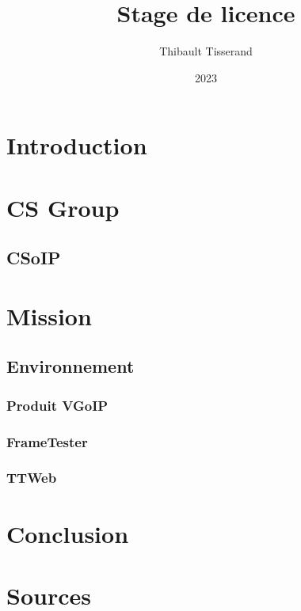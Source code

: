 \documentclass{beamer}
\title{Stage de licence}
\author{Thibault Tisserand}
\institute{Université de Lille}
\date{2023}
\begin{document}
\titlepage



\section{Introduction}


\section{CS Group}


\subsection{CSoIP}


\section{Mission}


\subsection{Environnement}


\subsubsection{Produit VGoIP}


\subsubsection{FrameTester}


\subsubsection{TTWeb}


\section{Conclusion}


\section{Sources}

\end{document}

